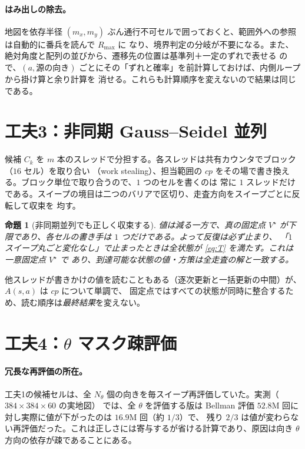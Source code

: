 \documentclass[11pt]{ltjsarticle}
\newtheorem{proposition}{命題}
\newcommand{\Rmax}{R_{\max}}        %
\begin{document}
\paragraph{はみ出しの除去。}
地図を依存半径 $(m_x,m_y)$ ぶん通行不可セルで囲っておくと、範囲外への参照は自動的に番兵を読んで $\Rmax$ に
なり、境界判定の分岐が不要になる。また、絶対角度と配列の並びから、遷移先の位置は基準列＋一定のずれで表せる
ので、$(a,\text{源の向き})$ ごとにその「ずれと確率」を前計算しておけば、内側ループから掛け算と余り計算を
消せる。これらも計算順序を変えないので結果は同じである。

\section{工夫3：非同期 Gauss--Seidel 並列}
\label{sec:par}

候補 $C_k$ を $m$ 本のスレッドで分担する。各スレッドは共有カウンタでブロック（$16$ セル）を取り合い
（work stealing）、担当範囲の $cp$ をその場で書き換える。ブロック単位で取り合うので、$1$ つのセルを書くのは
常に $1$ スレッドだけである。スイープの境目は二つのバリアで区切り、走査方向をスイープごとに反転して収束を
均す。

\begin{proposition}[非同期並列でも正しく収束する]
\label{prop:par}
値は減る一方で、真の固定点 $V^\star$ が下限であり、各セルの書き手は $1$ つだけである。よって反復は必ず止まり、
「$1$ スイープ丸ごと変化なし」で止まったときは全状態が \eqref{eq:T} を満たす。これは一意固定点 $V^\star$ で
あり、到達可能な状態の値・方策は全走査の解と一致する。
\end{proposition}

\noindent
他スレッドが書きかけの値を読むこともある（逐次更新と一括更新の中間）が、$A(s,a)$ は $cp$ について単調で、
固定点ではすべての状態が同時に整合するため、読む順序は\emph{最終結果}を変えない。

\section{工夫4：$\theta$ マスク疎評価}
\label{sec:sparse}

\paragraph{冗長な再評価の所在。}
工夫1の候補セルは、全 $N_\theta$ 個の向きを毎スイープ再評価していた。実測（$384\times384\times60$ の実地図）
では、全 $\theta$ を評価する版は Bellman 評価 $52.8$M 回に対し実際に値が下がったのは $16.9$M 回（約 $1/3$）で、
残り $2/3$ は値が変わらない再評価だった。これは正しさには寄与するが省ける計算であり、原因は向き $\theta$
方向の依存が疎であることにある。
\end{document}
